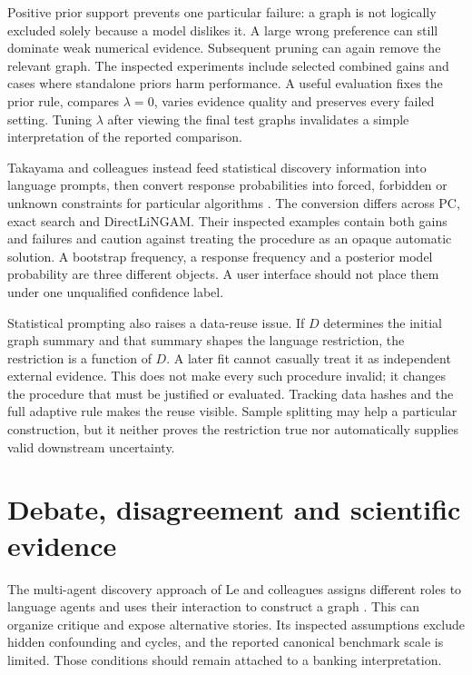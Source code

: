 Positive prior support prevents one particular failure: a graph is not
logically excluded solely because a model dislikes it. A large wrong
preference can still dominate weak numerical evidence. Subsequent pruning can
again remove the relevant graph. The inspected experiments include selected
combined gains and cases where standalone priors harm performance. A useful
evaluation fixes the prior rule, compares $\lambda=0$, varies evidence quality
and preserves every failed setting. Tuning $\lambda$ after viewing the final
test graphs invalidates a simple interpretation of the reported comparison.

Takayama and colleagues instead feed statistical discovery information into
language prompts, then convert response probabilities into forced, forbidden
or unknown constraints for particular algorithms
\citep{v12_la_2402_01454}. The conversion differs across PC, exact search and
DirectLiNGAM. Their inspected examples contain both gains and failures and
caution against treating the procedure as an opaque automatic solution.
A bootstrap frequency, a response frequency and a posterior model probability
are three different objects. A user interface should not place them under one
unqualified confidence label.

Statistical prompting also raises a data-reuse issue. If $D$ determines the
initial graph summary and that summary shapes the language restriction, the
restriction is a function of $D$. A later fit cannot casually treat it as
independent external evidence. This does not make every such procedure
invalid; it changes the procedure that must be justified or evaluated.
Tracking data hashes and the full adaptive rule makes the reuse visible.
Sample splitting may help a particular construction, but it neither proves the
restriction true nor automatically supplies valid downstream uncertainty.

\section{Debate, disagreement and scientific evidence}

The multi-agent discovery approach of Le and colleagues assigns different
roles to language agents and uses their interaction to construct a graph
\citep{v12_la_2407_15073}. This can organize critique and expose alternative
stories. Its inspected assumptions exclude hidden confounding and cycles, and
the reported canonical benchmark scale is limited. Those conditions should
remain attached to a banking interpretation.

